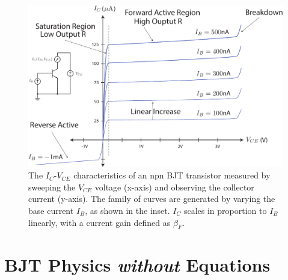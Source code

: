 \begin{figure}[tb]
\centering
\includegraphics[width=.75\columnwidth]{slide7_bjt_ic_vs_ib_curves}
\caption{The $I_C$-$V_{CE}$ characteristics of an npn BJT transistor measured by sweeping the $V_{CE}$ voltage (x-axis) and observing the collector current (y-axis).  The family of curves are generated by varying the base current $I_B$, as shown in the inset.  $I_C$ scales in proportion to $I_B$ linearly, with a current gain defined as $\beta_F$.}
\label{fig:slide7_bjt_ic_vs_ib_curves}
\end{figure}
\section{BJT Physics \emph{without} Equations}
